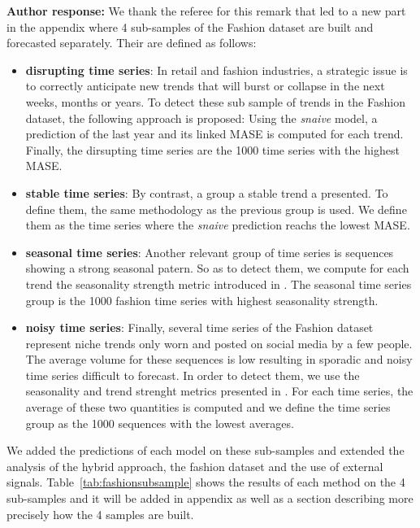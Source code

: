 \documentclass[10pt]{article} %
\begin{document}
\begin{itemize}
	\textbf{Author response:} We thank the referee for this remark that led to a new part in the appendix where 4 sub-samples of the Fashion dataset are built and forecasted separately. Their are defined as follows:
\begin{itemize}
	\item \textbf{disrupting time series}: In retail and fashion industries, a strategic issue is to correctly anticipate new trends that will burst or collapse in the next weeks, months or years. To detect these sub sample of trends in the Fashion dataset, the following approach is proposed: Using the \textit{snaive} model, a prediction of the last year and its linked MASE is computed for each trend. Finally, the dirsupting time series are the 1000 time series with the highest MASE.
	\item \textbf{stable time series}: By contrast, a group a stable trend a presented. To define them, the same methodology as the previous group is used. We define them as the time series where the \textit{snaive} prediction reachs the lowest MASE. 
	\item \textbf{seasonal time series}: Another relevant group of time series is sequences showing a strong seasonal patern. So as to detect them, we compute for each trend the seasonality strength metric introduced in \citet{wang2006}. The seasonal time series group is the 1000 fashion time series with highest seasonality strength.
	\item \textbf{noisy time series}: Finally, several time series of the Fashion dataset represent niche trends only worn and posted on social media by a few people. The average volume for these sequences is low resulting in sporadic and noisy time series difficult to forecast. In order to detect them, we use the seasonality and trend strenght metrics presented in \citet{wang2006}. For each time series, the average of these two quantities is computed and we define the time series group as the 1000 sequences with the lowest averages.
\end{itemize}
We added the predictions of each model on these sub-samples and extended the analysis of the hybrid approach, the fashion dataset and the use of external signals. Table~\ref{tab:fashionsubsample} shows the results of each method on the 4 sub-samples and it will be added in appendix as well as a section describing more precisely how the 4 samples are built.\\
\end{itemize}
\end{document}
